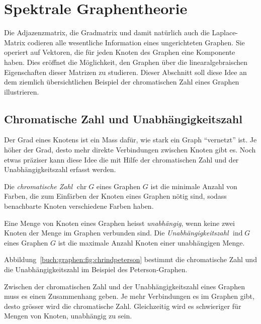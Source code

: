 %
%
%
\section{Spektrale Graphentheorie
\label{buch:section:spektrale-graphentheorie}}
Die Adjazenzmatrix, die Gradmatrix und damit natürlich auch
die Laplace-Matrix codieren alle wesentliche Information eines
ungerichteten Graphen.
Sie operiert auf Vektoren, die für jeden Knoten des Graphen eine
Komponente haben.
Dies eröffnet die Möglichkeit, den Graphen über die linearalgebraischen
Eigenschaften dieser Matrizen zu studieren.
Dieser Abschnitt soll diese Idee an dem ziemlich übersichtlichen Beispiel
der chromatischen Zahl eines Graphen illustrieren.

\subsection{Chromatische Zahl und Unabhängigkeitszahl
\label{buch:subsection:chromatische-zahl}}
Der Grad eines Knotens ist ein Mass dafür, wie stark ein Graph
``vernetzt'' ist.
Je höher der Grad, desto mehr direkte Verbindungen zwischen Knoten gibt es.
Noch etwas präziser kann diese Idee die mit Hilfe der 
chromatischen Zahl und der Unabhängigkeitszahl erfasst werden.

\begin{definition}
Die {\em chromatische Zahl} $\operatorname{chr}G$ eines Graphen $G$ ist
die minimale Anzahl von Farben, die zum Einfärben der Knoten eines Graphen
nötig sind, sodass benachbarte Knoten verschiedene Farben haben.
\end{definition}

\begin{definition}
Eine Menge von Knoten eines Graphen heisst {\em unabhängig}, wenn 
keine zwei Knoten der Menge im Graphen verbunden sind.
Die {\em Unabhängigkeitszahl} $\operatorname{ind}G$ eines Graphen $G$
ist die maximale Anzahl Knoten einer unabhängigen Menge.
\end{definition}

\begin{beispiel}
Abbildung~\ref{buch:graphen:fig:chrindpeterson} bestimmt die chromatische
Zahl und die Unabhängigkeitszahl im Beispiel des Peterson-Graphen.
\end{beispiel}

Zwischen der chromatischen Zahl und der Unabhängigkeitszahl eines Graphen
muss es einen Zusammenhang geben.
Je mehr Verbindungen es im Graphen gibt, desto grösser wird die chromatische
Zahl.
Gleichzeitig wird es schwieriger für Mengen von Knoten, unabhängig zu sein.

